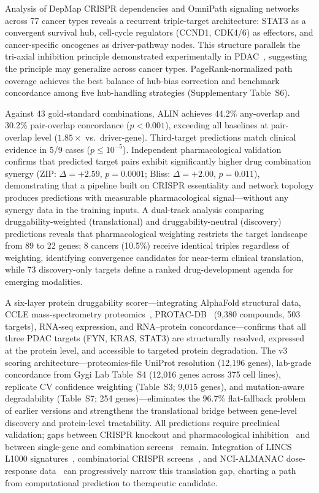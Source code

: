 \documentclass[times, twoside, watermark]{zHenriquesLab-StyleBioRxiv}
\begin{document}
Analysis of DepMap CRISPR dependencies and OmniPath signaling networks across 77 cancer types reveals a recurrent triple-target architecture: STAT3 as a convergent survival hub, cell-cycle regulators (CCND1, CDK4/6) as effectors, and cancer-specific oncogenes as driver-pathway nodes. This structure parallels the tri-axial inhibition principle demonstrated experimentally in PDAC~\cite{Liaki2025}, suggesting the principle may generalize across cancer types. PageRank-normalized path coverage achieves the best balance of hub-bias correction and benchmark concordance among five hub-handling strategies (Supplementary Table~S6).

Against 43 gold-standard combinations, ALIN achieves 44.2\% any-overlap and 30.2\% pair-overlap concordance ($p < 0.001$), exceeding all baselines at pair-overlap level ($1.85\times$ vs.\ driver-gene). Third-target predictions match clinical evidence in 5/9 cases ($p \leq 10^{-5}$). Independent pharmacological validation confirms that predicted target pairs exhibit significantly higher drug combination synergy (ZIP: $\Delta = +2.59$, $p = 0.0001$; Bliss: $\Delta = +2.00$, $p = 0.011$), demonstrating that a pipeline built on CRISPR essentiality and network topology produces predictions with measurable pharmacological signal---without any synergy data in the training inputs. A dual-track analysis comparing druggability-weighted (translational) and druggability-neutral (discovery) predictions reveals that pharmacological weighting restricts the target landscape from 89 to 22 genes; 8 cancers (10.5\%) receive identical triples regardless of weighting, identifying convergence candidates for near-term clinical translation, while 73 discovery-only targets define a ranked drug-development agenda for emerging modalities.

A six-layer protein druggability scorer---integrating AlphaFold structural data, CCLE mass-spectrometry proteomics~\cite{Nusinow2020}, PROTAC-DB~\cite{Weng2021} (9{,}380 compounds, 503 targets), RNA-seq expression, and RNA--protein concordance---confirms that all three PDAC targets (FYN, KRAS, STAT3) are structurally resolved, expressed at the protein level, and accessible to targeted protein degradation. The v3 scoring architecture---proteomics-file UniProt resolution (12{,}196 genes), lab-grade concordance from Gygi Lab Table~S4 (12{,}016 genes across 375 cell lines), replicate CV confidence weighting (Table~S3; 9{,}015 genes), and mutation-aware degradability (Table~S7; 254 genes)---eliminates the 96.7\% flat-fallback problem of earlier versions and strengthens the translational bridge between gene-level discovery and protein-level tractability. All predictions require preclinical validation; gaps between CRISPR knockout and pharmacological inhibition~\cite{Lin2017,Goncalves2020} and between single-gene and combination screens~\cite{Norman2019} remain. Integration of LINCS L1000 signatures~\cite{Subramanian2017}, combinatorial CRISPR screens~\cite{Norman2019}, and NCI-ALMANAC dose-response data~\cite{Holbeck2017} can progressively narrow this translation gap, charting a path from computational prediction to therapeutic candidate.
\end{document}
